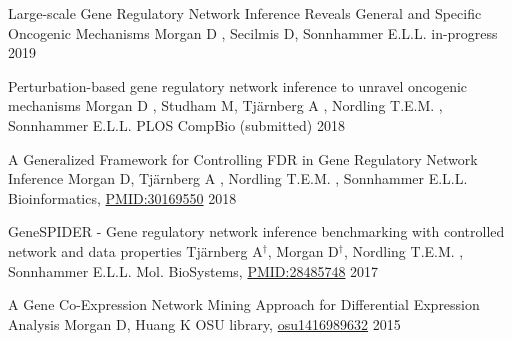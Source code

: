 {}
\begin{cvhonors}
\cvhonor
	{Large-scale Gene Regulatory Network Inference Reveals General and Specific Oncogenic Mechanisms}
    {Morgan D , Secilmis D, Sonnhammer E.L.L.}
    {in-progress}
    {2019}
    

\cvhonor
	{Perturbation-based gene regulatory network inference to unravel oncogenic mechanisms}
    {Morgan D , Studham M, Tj{\"a}rnberg A , Nordling T.E.M. , Sonnhammer E.L.L.}
    {PLOS CompBio (submitted)}
    {2018}
    
\cvhonor
    {A Generalized Framework for Controlling FDR in Gene Regulatory Network Inference}
    {Morgan D, Tj{\"a}rnberg A ,  Nordling T.E.M. , Sonnhammer E.L.L.}
	{Bioinformatics, \href{https://www.ncbi.nlm.nih.gov/pubmed/30169550}{PMID:30169550}}
    {2018}

  \cvhonor
    {GeneSPIDER - Gene regulatory network inference benchmarking with controlled network and data properties}
    {Tj{\"a}rnberg A\textit{$^{\dagger}$}, Morgan D\textit{$^{\dagger}$},  Nordling T.E.M. , Sonnhammer E.L.L.}
{Mol. BioSystems, \href{https://www.ncbi.nlm.nih.gov/pubmed/28485748}{PMID:28485748}}
    {2017}

\cvhonor
	{A Gene Co-Expression Network Mining Approach for Differential Expression Analysis}
    {Morgan D, Huang K}
    {OSU library, \href{http://rave.ohiolink.edu/etdc/view?acc_num=osu1416989632}{osu1416989632}}
    {2015}
    
\end{cvhonors}
